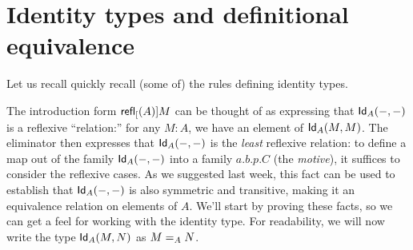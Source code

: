 \documentclass{article}
\begin{document}
\section{Identity types and definitional equivalence}
\label{sec:identitytypes}

Let us recall quickly recall (some of) the rules defining identity types.

The introduction form $\refl[A]{M}$ can be thought of as expressing that
$\Id{A}{-}{-}$ is a reflexive ``relation:'' for any $M:A$, we have an element of
$\Id{A}{M}{M}$. The eliminator then expresses that $\Id{A}{-}{-}$ is the
\emph{least} reflexive relation: to define a map out of the family
$\Id{A}{-}{-}$ into a family $a.b.p.C$ (the \emph{motive}), it suffices to
consider the reflexive cases. As we suggested last week, this fact can be used
to establish that $\Id{A}{-}{-}$ is also symmetric and transitive, making it an
equivalence relation on elements of $A$. We'll start by proving these facts, so
we can get a feel for working with the identity type. For readability, we will
now write the type $\Id{A}{M}{N}$ as $\Ideq{A}{M}{N}$.
\end{document}
